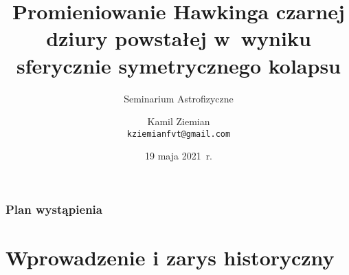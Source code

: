 \documentclass[10pt,t]{beamer}
\title{Promieniowanie Hawkinga czarnej dziury powstałej w~wyniku sferycznie
  symetrycznego kolapsu}
\subtitle{Seminarium Astrofizyczne}
\author{Kamil Ziemian \\
  \texttt{kziemianfvt@gmail.com}}
\institute{Zakład Teorii Pola, \\
  Uniwersytet Jagielloński w~Krakowie}
\date[19 maja 2021~r.]{19 maja 2021~r.}
\begin{document}






\RaggedRight





\maketitle %





\begin{frame}
  \frametitle{Plan wystąpienia}


  \tableofcontents

\end{frame}





\section{Wprowadzenie i zarys historyczny}
\end{document}
